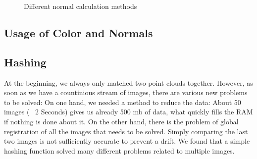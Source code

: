 \documentclass[10pt,twocolumn,letterpaper]{article}
\begin{document}
\begin{figure}
  \centering
  \quad
  \quad
  \caption{Different normal calculation methods}
  \label{fig:normals}
\end{figure}


\subsection{Usage of Color and Normals}

\subsection{Hashing}
At the beginning, we always only matched two point clouds together. However, as soon as we have a countinious stream of images,
there are various new problems to be solved: On one hand, we needed a method to reduce the data: About 50 images (~ 2 Seconds)
gives us already 500 mb of data, what quickly fills the RAM if nothing is done about it. On the other hand, there is the problem
of global registration of all the images that needs to be solved. Simply comparing the last two images is not sufficiently accurate
to prevent a drift. We found that a simple hashing function solved many different problems related to multiple images.
\end{document}
